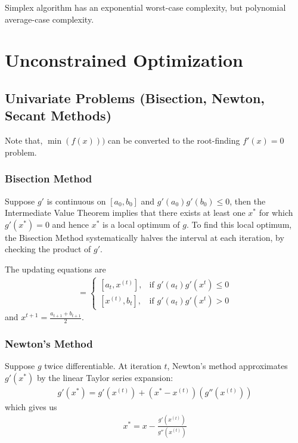 \documentclass{memoir}
\begin{document}




Simplex algorithm has an exponential worst-case complexity, but polynomial average-case complexity.

\chapter{Unconstrained Optimization}
\section{Univariate Problems (Bisection, Newton, Secant Methods)}
Note that, $\min(f(x)))$ can be converted to the root-finding $f'(x) = 0$ problem.

\subsection{Bisection Method}
Suppose $g'$ is continuous on $[a_0,b_0]$ and $g'(a_0)g'(b_0) \le 0$, then the Intermediate Value Theorem implies that there exists at least one $x^*$ for which $g'(x^*) = 0$ and hence $x^*$ is a local optimum of $g$. To find this local optimum, the Bisection Method systematically halves the interval at each iteration, by checking the product of $g'$.

The updating equations are
\begin{align}
[a_{t+1},b_{t+1}] =
	\begin{cases}
		[a_t,x^{(t)}], & \mbox{if } g'(a_t)g'(x^{t}) \le 0 \\
		[x^{(t)},b_t], & \mbox{if } g'(a_t)g'(x^{t}) > 0
	\end{cases}
\end{align}
and $x^{t+1} = \frac{a_{t+1}+b_{t+1}}{2}$.

\subsection{Newton's Method}
Suppose $g$ twice differentiable. At iteration $t$, Newton's method approximates $g'(x^*)$ by the linear Taylor series expansion:
\begin{align}
	g'(x^*) = g'(x^{(t)}) + (x^*-x^{(t)})(g''(x^{(t)}))
\end{align}
which gives us
\begin{align}
	x^* = x - \frac{g'(x^{(t)})}{g''(x^{(t)})}
\end{align}
\end{document}
